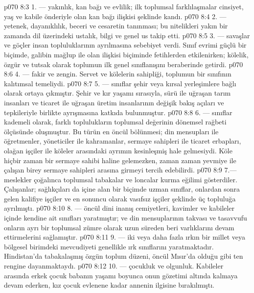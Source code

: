 \vs p070 8:3 1.\bibnobreakspace {} --- yakınlık, kan bağı ve evlilik; ilk toplumsal farklılaşmalar cinsiyet, yaş ve kabile önderiyle olan kan bağı ilişkisi şeklinde kandı.
\vs p070 8:4 2.\bibnobreakspace {} --- yetenek, dayanıklılık, beceri ve cesaretin tanınması; bu nitelikleri yakın bir zamanda dil üzerindeki ustalık, bilgi ve genel us takip etti.
\vs p070 8:5 3.\bibnobreakspace {} --- savaşlar ve göçler insan topluluklarının ayrılmasına sebebiyet verdi. Sınıf evrimi güçlü bir biçimde, galibin mağlup ile olan ilişkisi biçiminde fetihlerden etkilenirken; kölelik, özgür ve tutsak olarak toplumun ilk genel sınıflanışını beraberinde getirdi.
\vs p070 8:6 4.\bibnobreakspace {} --- fakir ve zengin. Servet ve kölelerin sahipliği, toplumun bir sınıfının kalıtımsal temeliydi.
\vs p070 8:7 5.\bibnobreakspace {} --- sınıflar şehir veya kırsal yerleşimlere bağlı olarak ortaya çıkmıştır. Şehir ve kır yaşamı sırasıyla, sürü ile uğraşan tarım insanları ve ticaret ile uğraşan üretim insanlarının değişik bakış açıları ve tepkileriyle birlikte ayrışmasına katkıda bulunmuştur.
\vs p070 8:8 6.\bibnobreakspace {} --- sınıflar kademeli olarak, farklı toplulukların toplumsal değerinin dönemsel rağbeti ölçüsünde oluşmuştur. Bu türün en öncül bölünmesi; din mensupları ile öğretmenler, yöneticiler ile kahramanlar, sermaye sahipleri ile ticaret erbapları, olağan işçiler ile köleler arasındaki ayrımın kesinleşmiş hale gelmesiydi. Köle hiçbir zaman bir sermaye sahibi haline gelemezken, zaman zaman yevmiye ile çalışan birey sermaye sahipleri arasına girmeyi tercih edebilirdi.
\vs p070 8:9 7.\bibnobreakspace {}--- meslekler çoğalınca toplumsal tabakalar ve loncalar kurma eğilimi gösterdiler. Çalışanlar; sağlıkçıları da içine alan bir biçimde uzman sınıflar, onlardan sonra gelen kalifiye işçiler ve en sonuncu olarak vasıfsız işçiler şeklinde üç topluluğa ayrılmıştı.
\vs p070 8:10 8.\bibnobreakspace {} --- öncül dini inanış cemiyetleri, kavimler ve kabileler içinde kendine ait sınıfları yaratmıştır; ve din mensuplarının takvası ve tasavvufu onların ayrı bir toplumsal zümre olarak uzun süreden beri varlıklarını devam ettirmelerini sağlamıştır.
\vs p070 8:11 9.\bibnobreakspace {} --- iki veya daha fazla ırkın bir millet veya bölgesel birimdeki mevcudiyeti genellikle ırk sınıflarını yaratmaktadır. Hindistan’da tabakalaşmış özgün toplum düzeni, öncül Mısır’da olduğu gibi ten rengine dayanmaktaydı.
\vs p070 8:12 10.\bibnobreakspace {} --- çocukluk ve olgunluk. Kabileler arasında erkek çocuk babanın yaşamı boyunca onun gözetimi altında kalmaya devam ederken, kız çocuk evlenene kadar annenin ilgisine bırakılmıştı.
